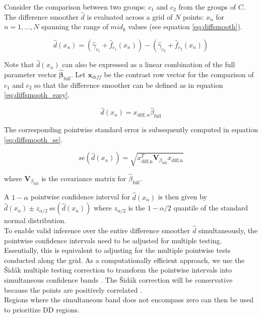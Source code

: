 Consider the comparison between two groups: $c_1$ and $c_2$ from the groups of $C$. The difference smoother $\hat{d}$ is evaluated across a grid of $N$ points: $x_n$ for $n = 1, \ldots, N$ spanning the range of $mid_k$ values (see equation \ref{eq:diffsmooth}).

\begin{equation}
\hat{d}(x_n) = (\hat{\gamma}_{c_1} + \hat{f}_{c_1}(x_n)) - (\hat{\gamma}_{c_2} + \hat{f}_{c_2}(x_n))
\label{eq:diffsmooth}
\end{equation}

Note that $\hat{d}(x_n)$ can also be expressed as a linear combination of the full parameter vector $\hat{\boldsymbol{\beta}}_{\text{full}}$. Let $\boldsymbol{x}_{diff}$ be the contrast row vector for the comparison of $c_1$ and $c_2$ so that the difference smoother can be defined as in equation \ref{eq:diffsmooth_easy}.

\begin{equation}
\hat{d}(x_n) = x_{\text{diff},n}\hat{\beta}_{\text{full}}
\label{eq:diffsmooth_easy}
\end{equation}

The corresponding pointwise standard error is subsequently computed in equation \ref{eq:diffsmooth_se}.

\begin{equation}
se(\hat{d}(x_n)) = \sqrt{x_{\text{diff,n}}^T\boldsymbol{V}_{\beta_{\text{full}}}x_{\text{diff,n}}}
\label{eq:diffsmooth_se}
\end{equation}

where $\boldsymbol{V}_{\beta_{\text{full}}}$ is the covariance matrix for $\hat{\beta}_{\text{full}}$.

A $1-\alpha$ pointwise confidence interval for $\hat{d}(x_n)$ is then given by $\hat{d}(x_n) \pm  z_{\alpha/2}\,se(\hat{d}(x_n))$ where $z_{\alpha/2}$ is the $1-\alpha/2$ quantile of the standard normal distribution.\\
To enable valid inference over the entire difference smoother $\hat{d}$ simultaneously, the pointwise confidence intervals need to be adjusted for multiple testing. Essentially, this is equivalent to adjusting for the multiple pointwise tests conducted along the grid. As a computationally efficient approach, we use the Šidák multiple testing correction to transform the pointwise intervals into simultaneous confidence bands \cite{sidak}. The Šidák correction will be conservative because the points are positively correlated \cite{simes}.\\
Regions where the simultaneous band does not encompass zero can then be used to prioritize DD regions.

